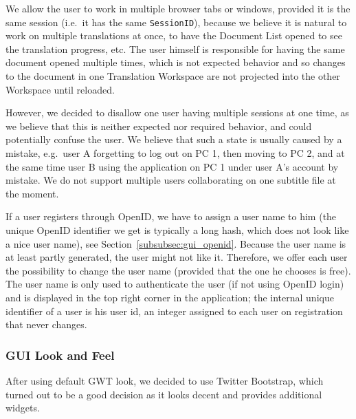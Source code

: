 {We allow the user to work in multiple browser tabs or windows, provided it is the same session (i.e.\ it has the same {\tt SessionID}), because we believe it is natural to work on multiple translations at once, to have the Document List opened to see the translation progress, etc. The user himself is responsible for having the same document opened multiple times, which is not expected behavior and so changes to the document in one Translation Workspace are not projected into the other Workspace until reloaded.

However, we decided to disallow one user having multiple sessions at one time, as we believe that this is neither expected nor required behavior, and could potentially confuse the user. We believe that such a state is usually caused by a mistake, e.g.\ user A forgetting to log out on PC 1, then moving to PC 2, and at the same time user B using the application on PC 1 under user A's account by mistake.
We do not support multiple users collaborating on one subtitle file at the moment.

If a user registers through OpenID, we have to assign a user name to him (the unique OpenID identifier we get is typically a long hash, which does not look like a nice user name), see Section~\ref{subsubsec:gui_openid}. Because the user name is at least partly generated, the user might not like it. Therefore, we offer each user the possibility to change the user name (provided that the one he chooses is free). The user name is only used to authenticate the user (if not using OpenID login) and is displayed in the top right corner in the application; the internal unique identifier of a user is his user id, an integer assigned to each user on registration that never changes.

\subsubsection{GUI Look and Feel}

After using default GWT look, we decided to use Twitter Bootstrap, which turned out to be a good decision as it looks decent and provides additional widgets.

}
